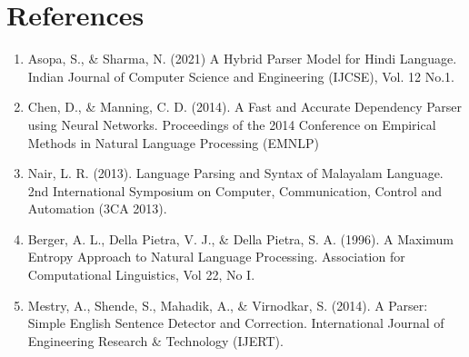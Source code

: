 \documentclass[12pt]{article}
\begin{document}
	\section*{References}
	\begin{enumerate}
		\item Asopa, S., \& Sharma, N. (2021) A Hybrid Parser Model for Hindi Language. Indian
		Journal of Computer Science and Engineering (IJCSE), Vol. 12 No.1.
		\item Chen, D., \& Manning, C. D. (2014). A Fast and Accurate Dependency Parser using
		Neural Networks. Proceedings of the 2014 Conference on Empirical Methods in
		Natural Language Processing (EMNLP)
		\item Nair, L. R. (2013). Language Parsing and Syntax of Malayalam Language. 2nd
		International Symposium on Computer, Communication, Control and Automation
		(3CA 2013).
		\item Berger, A. L., Della Pietra, V. J., \& Della Pietra, S. A. (1996). A Maximum Entropy
		Approach to Natural Language Processing. Association for Computational
		Linguistics, Vol 22, No I.
		\item Mestry, A., Shende, S., Mahadik, A., \& Virnodkar, S. (2014). A Parser: Simple
		English Sentence Detector and Correction. International Journal of Engineering
		Research \& Technology (IJERT).
	\end{enumerate}
	
\end{document}
